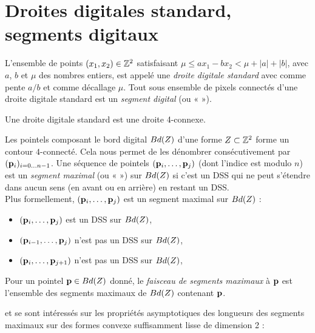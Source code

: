 \section{Droites digitales standard, segments digitaux}%
\label{sec:segments}
%
\begin{definition}{}
  \label{def:DSS}
%
  L'ensemble de points $(x_1,x_2) \in \mathbb{Z}^2$ satisfaisant $\mu \le ax_1 - bx_2 <
  \mu + |a| + |b|$, avec $a$, $b$ et $\mu$ des nombres entiers, est appelé une
  \emph{droite digitale standard} avec comme pente $a/b$ et comme décallage
  $\mu$. Tout sous ensemble de pixels connectés d'une droite digitale standard
  est un \emph{segment digital} (ou «  »).
%
\end{definition}
%
Une droite digitale standard est une droite 4-connexe.
%
\begin{definition}{}
  \label{def:MDSS}
%
  Les pointels composant le bord digital $Bd({Z})$ d'une forme
  $Z \subset \mathbb{Z}^2$ forme un contour $4$-connecté. Cela nous permet de
  les dénombrer consécutivement par $(\mathbf{p}_i)_{i={0\ldots n-1}}$. Une séquence de
  pointels $(\mathbf{p}_i, \ldots, \mathbf{p}_j)$ (dont l'indice est modulo $n$) est un
  \emph{segment maximal} (ou «  ») sur $Bd({Z})$ si c'est
  un DSS qui ne peut s'étendre dans aucun sens (en avant ou en arrière) en
  restant un DSS.
  \\
  Plus formellement, $(\mathbf{p}_i, \ldots, \mathbf{p}_j)$ est un segment maximal sur $Bd({Z})$ \ssi :
  \begin{itemize}
    \item $(\mathbf{p}_i, \ldots, \mathbf{p}_j)$ est un DSS sur $Bd({Z})$,
    \item $(\mathbf{p}_{i-1}, \ldots, \mathbf{p}_j)$ n'est pas un DSS sur $Bd({Z})$,
    \item $(\mathbf{p}_i, \ldots, \mathbf{p}_{j+1})$ n'est pas un DSS sur $Bd({Z})$,
  \end{itemize}
  Pour un pointel $\mathbf{p} \in Bd({Z})$ donné, le \emph{faisceau de segments maximaux} à $\mathbf{p}$ est l'ensemble
  des segments maximaux de $Bd({Z})$ contenant $\mathbf{p}$.
%
\end{definition}
%
 et  se sont intéressés sur les propriétés
asymptotiques des longueurs des segments maximaux sur des formes convexe
suffisamment lisse de dimension 2 :
